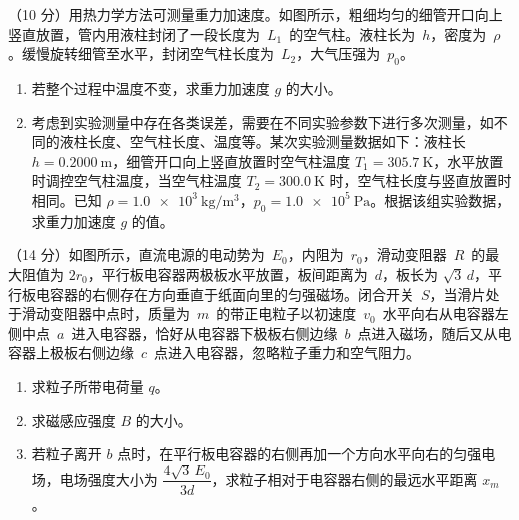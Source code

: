 \begin{question}
（10 分）用热力学方法可测量重力加速度。如图所示，粗细均匀的细管开口向上竖直放置，管内用液柱封闭了一段长度为~$L_{1}$~的空气柱。液柱长为~$h$，密度为~$\rho$。缓慢旋转细管至水平，封闭空气柱长度为~$L_{2}$，大气压强为~$p_{0}$。


\begin{enumerate}[leftmargin=2em, label=(\arabic*)]
  \item 若整个过程中温度不变，求重力加速度 $g$ 的大小。
  \item 考虑到实验测量中存在各类误差，需要在不同实验参数下进行多次测量，如不同的液柱长度、空气柱长度、温度等。某次实验测量数据如下：液柱长 $h=\SI{0.2000}{\metre}$，细管开口向上竖直放置时空气柱温度 $T_{1}=\SI{305.7}{\kelvin}$，水平放置时调控空气柱温度，当空气柱温度 $T_{2}=\SI{300.0}{\kelvin}$ 时，空气柱长度与竖直放置时相同。已知 $\rho=\SI{1.0e3}{\kilogram\per\cubic\metre}$，$p_{0}=\SI{1.0e5}{\pascal}$。根据该组实验数据，求重力加速度 $g$ 的值。
\end{enumerate}
\end{question}

\begin{question}
（14 分）如图所示，直流电源的电动势为~$E_{0}$，内阻为~$r_{0}$，滑动变阻器~$R$~的最大阻值为 $2r_{0}$，平行板电容器两极板水平放置，板间距离为~$d$，板长为 $\sqrt{3}\,d$，平行板电容器的右侧存在方向垂直于纸面向里的匀强磁场。闭合开关~$S$，当滑片处于滑动变阻器中点时，质量为~$m$~的带正电粒子以初速度~$v_{0}$~水平向右从电容器左侧中点~$a$~进入电容器，恰好从电容器下极板右侧边缘~$b$~点进入磁场，随后又从电容器上极板右侧边缘~$c$~点进入电容器，忽略粒子重力和空气阻力。


\begin{enumerate}[leftmargin=2em, label=(\arabic*)]
  \item 求粒子所带电荷量 $q$。
  \item 求磁感应强度 $B$ 的大小。
  \item 若粒子离开 $b$ 点时，在平行板电容器的右侧再加一个方向水平向右的匀强电场，电场强度大小为 $\dfrac{4\sqrt{3}\,E_{0}}{3d}$，求粒子相对于电容器右侧的最远水平距离 $x_{m}$。
\end{enumerate}
\end{question}

